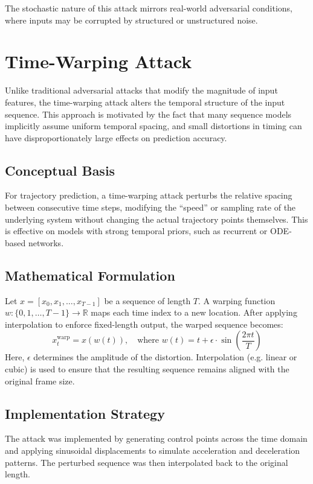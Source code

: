 The stochastic nature of this attack mirrors real-world adversarial conditions, where inputs may be corrupted by structured or unstructured noise.

\section{Time-Warping Attack}

Unlike traditional adversarial attacks that modify the magnitude of input features, the time-warping attack alters the temporal structure of the input sequence. This approach is motivated by the fact that many sequence models implicitly assume uniform temporal spacing, and small distortions in timing can have disproportionately large effects on prediction accuracy.

\subsection{Conceptual Basis}
For trajectory prediction, a time-warping attack perturbs the relative spacing between consecutive time steps, modifying the “speed” or sampling rate of the underlying system without changing the actual trajectory points themselves. This is effective on models with strong temporal priors, such as recurrent or ODE-based networks.

\subsection{Mathematical Formulation}
Let $x = [x_0, x_1, \dots, x_{T-1}]$ be a sequence of length $T$. A warping function $w: \{0, 1, \dots, T-1\} \to \mathbb{R}$ maps each time index to a new location. After applying interpolation to enforce fixed-length output, the warped sequence becomes:
\[
x^{\text{warp}}_t = x(w(t)), \quad \text{where } w(t) = t + \epsilon \cdot \sin\left( \frac{2\pi t}{T} \right)
\]
Here, $\epsilon$ determines the amplitude of the distortion. Interpolation (e.g. linear or cubic) is used to ensure that the resulting sequence remains aligned with the original frame size.

\subsection{Implementation Strategy}
The attack was implemented by generating control points across the time domain and applying sinusoidal displacements to simulate acceleration and deceleration patterns. The perturbed sequence was then interpolated back to the original length.

